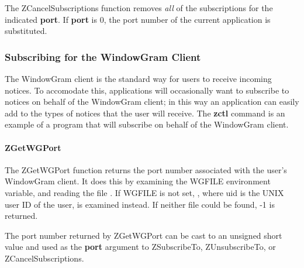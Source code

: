 \etemplate
{}

The ZCancelSubscriptions function removes {\em all\/} of the
subscriptions for the indicated {\bf port}.  If {\bf port} is 0, the
port number of the current application is substituted.

\subsubsection{Subscribing for the WindowGram Client}
\label{subscribing-zwgc}

The WindowGram client is the standard way for users to receive incoming
notices.  To accomodate this, applications will occasionally want to
subscribe to notices on behalf of the WindowGram client; in this way an
application can easily add to the types of notices that the user will
receive.  The {\bf zctl} command is an example of a program that will
subscribe on behalf of the WindowGram client.

\paragraph{ZGetWGPort}
\label{ZGetWGPort}

\etemplate
{}

The ZGetWGPort function returns the port number associated with the
user's WindowGram client.  It does this by examining the WGFILE
environment variable, and reading the file .
If WGFILE is not set, , where uid is the
UNIX user ID of the user, is examined instead.  If neither file could be
found, -1 is returned.

The port number returned by ZGetWGPort can be cast to an unsigned short
value and used as the {\bf port} argument to ZSubscribeTo,
ZUnsubscribeTo, or ZCancelSubscriptions.
